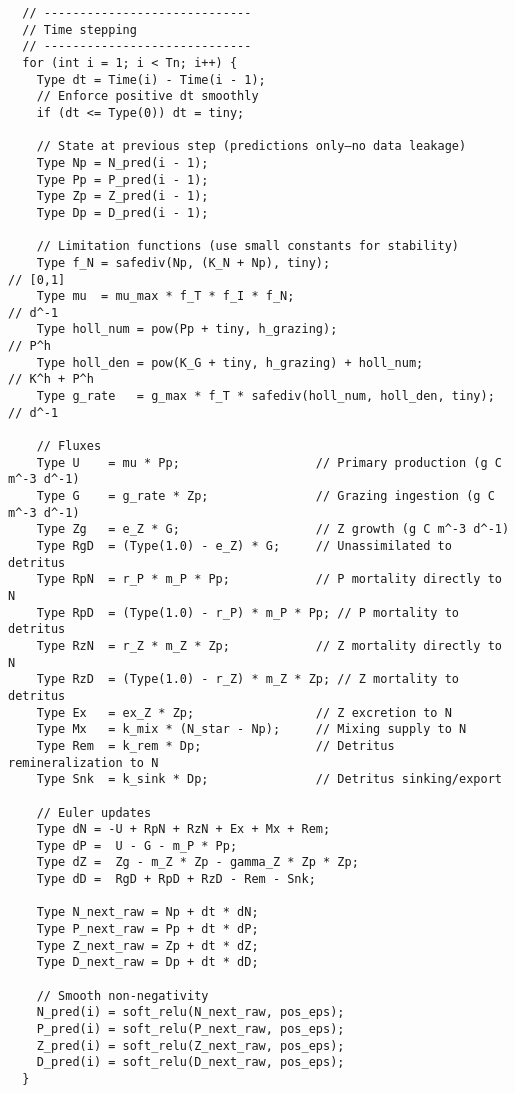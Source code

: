 \begin{lstlisting}
  // -----------------------------
  // Time stepping
  // -----------------------------
  for (int i = 1; i < Tn; i++) {
    Type dt = Time(i) - Time(i - 1);
    // Enforce positive dt smoothly
    if (dt <= Type(0)) dt = tiny;

    // State at previous step (predictions only—no data leakage)
    Type Np = N_pred(i - 1);
    Type Pp = P_pred(i - 1);
    Type Zp = Z_pred(i - 1);
    Type Dp = D_pred(i - 1);

    // Limitation functions (use small constants for stability)
    Type f_N = safediv(Np, (K_N + Np), tiny);                                // [0,1]
    Type mu  = mu_max * f_T * f_I * f_N;                                     // d^-1
    Type holl_num = pow(Pp + tiny, h_grazing);                               // P^h
    Type holl_den = pow(K_G + tiny, h_grazing) + holl_num;                   // K^h + P^h
    Type g_rate   = g_max * f_T * safediv(holl_num, holl_den, tiny);         // d^-1

    // Fluxes
    Type U    = mu * Pp;                   // Primary production (g C m^-3 d^-1)
    Type G    = g_rate * Zp;               // Grazing ingestion (g C m^-3 d^-1)
    Type Zg   = e_Z * G;                   // Z growth (g C m^-3 d^-1)
    Type RgD  = (Type(1.0) - e_Z) * G;     // Unassimilated to detritus
    Type RpN  = r_P * m_P * Pp;            // P mortality directly to N
    Type RpD  = (Type(1.0) - r_P) * m_P * Pp; // P mortality to detritus
    Type RzN  = r_Z * m_Z * Zp;            // Z mortality directly to N
    Type RzD  = (Type(1.0) - r_Z) * m_Z * Zp; // Z mortality to detritus
    Type Ex   = ex_Z * Zp;                 // Z excretion to N
    Type Mx   = k_mix * (N_star - Np);     // Mixing supply to N
    Type Rem  = k_rem * Dp;                // Detritus remineralization to N
    Type Snk  = k_sink * Dp;               // Detritus sinking/export

    // Euler updates
    Type dN = -U + RpN + RzN + Ex + Mx + Rem;
    Type dP =  U - G - m_P * Pp;
    Type dZ =  Zg - m_Z * Zp - gamma_Z * Zp * Zp;
    Type dD =  RgD + RpD + RzD - Rem - Snk;

    Type N_next_raw = Np + dt * dN;
    Type P_next_raw = Pp + dt * dP;
    Type Z_next_raw = Zp + dt * dZ;
    Type D_next_raw = Dp + dt * dD;

    // Smooth non-negativity
    N_pred(i) = soft_relu(N_next_raw, pos_eps);
    P_pred(i) = soft_relu(P_next_raw, pos_eps);
    Z_pred(i) = soft_relu(Z_next_raw, pos_eps);
    D_pred(i) = soft_relu(D_next_raw, pos_eps);
  }


\end{lstlisting}
